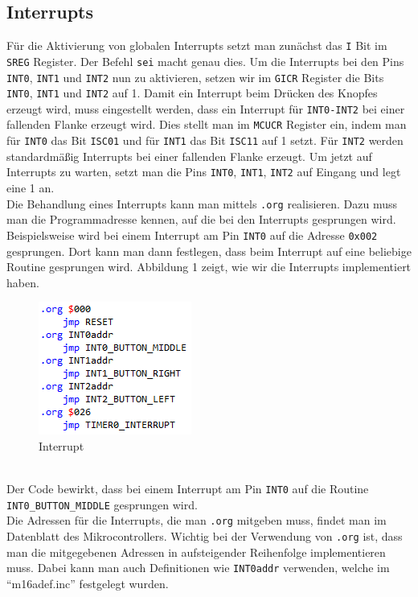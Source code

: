 \documentclass[]{article}
\begin{document}
\subsection{Interrupts}
\label{interrupts}
Für die Aktivierung von globalen Interrupts setzt man zunächst das \texttt{I} Bit im \texttt{SREG} Register. Der Befehl \texttt{sei} macht genau dies. Um die Interrupts bei den Pins \texttt{INT0}, \texttt{INT1} und \texttt{INT2} nun zu aktivieren, setzen wir im \texttt{GICR} Register die Bits \texttt{INT0}, \texttt{INT1} und \texttt{INT2} auf 1. Damit ein Interrupt beim Drücken des Knopfes erzeugt wird, muss eingestellt werden, dass ein Interrupt für \texttt{INT0-INT2} bei einer fallenden Flanke erzeugt wird. Dies stellt man im \texttt{MCUCR} Register ein, indem man für \texttt{INT0} das Bit \texttt{ISC01} und für \texttt{INT1} das Bit \texttt{ISC11} auf 1 setzt. Für \texttt{INT2} werden standardmäßig Interrupts bei einer fallenden Flanke erzeugt. Um jetzt auf Interrupts zu warten, setzt man die Pins \texttt{INT0}, \texttt{INT1}, \texttt{INT2} auf Eingang und legt eine 1 an. 
\\Die Behandlung eines Interrupts kann man mittels \texttt{.org} realisieren. Dazu muss man die Programmadresse kennen, auf die bei den Interrupts gesprungen wird. Beispielsweise wird bei einem Interrupt am Pin \texttt{INT0} auf die Adresse \texttt{0x002} gesprungen. Dort kann man dann festlegen, dass beim Interrupt auf eine beliebige Routine gesprungen wird. Abbildung 1 zeigt, wie wir die Interrupts implementiert haben.
\begin{figure}[h]
	\centering
	\includegraphics[width=0.35\columnwidth]{Interrupt.png}
	\caption{Interrupt}
\end{figure}
\\Der Code bewirkt, dass bei einem Interrupt am Pin \texttt{INT0} auf die Routine \texttt{INT0\_BUTTON\_MIDDLE} gesprungen wird.
\\Die Adressen für die Interrupts, die man \texttt{.org} mitgeben muss, findet man im Datenblatt des Mikrocontrollers. Wichtig bei der Verwendung von \texttt{.org} ist, dass man die mitgegebenen Adressen in aufsteigender Reihenfolge implementieren muss. Dabei kann man auch Definitionen wie \texttt{INT0addr} verwenden, welche im "`m16adef.inc"' festgelegt wurden.
\end{document}
